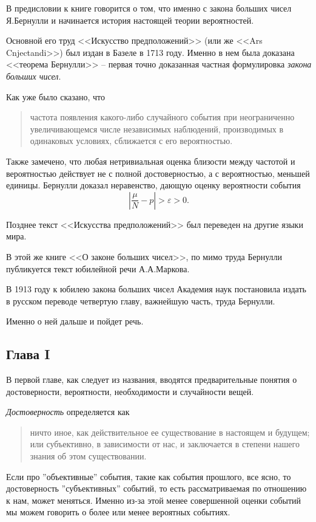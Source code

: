 \documentclass[12pt]{extarticle}
\begin{document}
В предисловии к книге говорится о том, что именно с закона больших чисел Я.Бернулли и начинается история настоящей теории вероятностей.

Основной его труд <<Искусство предположений>> (или же <<Ars Cnjectandi>>) был издан в Базеле в 1713 году.
Именно в нем была доказана <<теорема Бернулли>> -- первая точно доказанная частная формулировка \textit{закона больших чисел}.

Как уже было сказано, что 
\begin{quote}
	частота появления какого-либо случайного события при неограниченно увеличивающемся числе независимых наблюдений, производимых в одинаковых условиях, сближается с его вероятностью.
\end{quote}
Также замечено, что любая нетривиальная оценка близости между частотой и вероятностью действует не с полной достоверностью, а с вероятностью, меньшей единицы.
Бернулли доказал неравенство, дающую оценку вероятности события
$$\left| \frac{\mu}{N} - p \right| > \varepsilon > 0.$$

Позднее текст <<Искусства предположений>> был переведен на другие языки мира.

В этой же книге <<О законе больших чисел>>, по мимо труда Бернулли публикуется текст юбилейной речи А.А.Маркова.

В 1913 году к юбилею закона больших чисел Академия наук постановила издать в русском переводе четвертую главу, важнейшую часть, труда Бернулли.

Именно о ней дальше и пойдет речь.

\newpage
\subsection{Глава I}
В первой главе, как следует из названия, вводятся предварительные понятия о достоверности, вероятности, необходимости и случайности вещей.

\textit{Достоверность} определяется как 
\begin{quote}
ничто иное, как действительное ее существование в настоящем и будущем; или субъективно, в зависимости от нас, и заключается в степени нашего знания об этом существовании.
\end{quote}
Если про ''объективные'' события, такие как события прошлого, все ясно, то достоверность ''субъективных'' событий, то есть рассматриваемая по отношению к нам, может меняться.
Именно из-за этой менее совершенной оценки событий мы можем говорить о более или менее вероятных событиях.
\end{document}
